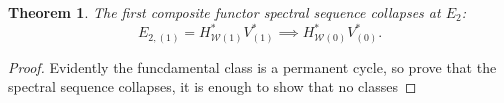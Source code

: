 \documentclass[11pt]{amsart}
\theoremstyle{plain}
\newtheorem{thm}{Theorem}[section]
\theoremstyle{definition}
\newcommand{\calw}{\mathcal{W}}
\theoremstyle{plain}
\newcommand{\Sqh}{\mathrm{Sq}_\textup{h}}
\newcommand{\Sqv}{\mathrm{Sq}_\textup{v}}
\begin{document}
\begin{Calculations of HW0}
\begin{thm}
The first composite functor spectral sequence collapses at $E_2$:
\[E_{2,(1)}=H^*_{\calw(1)}V^*_{(1)}\implies H^*_{\calw(0)}V^*_{(0)}.\]
\end{thm}
\begin{proof}
Evidently the funcdamental class is a permanent cycle, so prove that the spectral sequence collapses, it is enough to show that no classes
%
%
%
%

\end{proof}
\end{Calculations of HW0}
\end{document}
